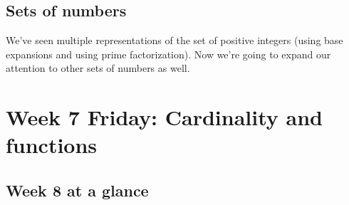 \newpage
\subsection*{Sets of numbers}

We've seen multiple representations of the set of positive integers
(using base expansions and using prime factorization). Now we're 
going to expand our attention to other sets of numbers as well.




\newpage

\section*{Week 7 Friday: Cardinality and functions}

%




\newpage

\newpage




%
\newpage




\vfill

\vfill
%

\vfill




\newpage
\newpage

\subsection*{Week 8 at a glance}

